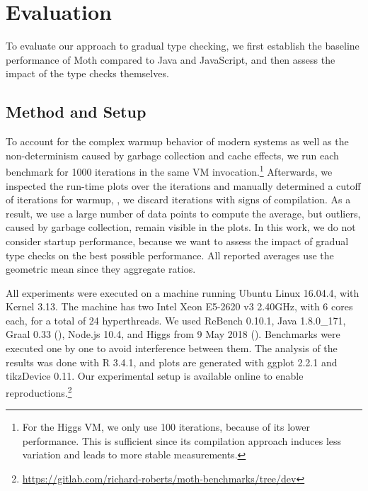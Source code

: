 
\section{Evaluation}
\label{sec:evaluation}

\newcommand{\NumIterationsAll}{1000\xspace}
\newcommand{\NumIterationsHiggs}{100\xspace}


To evaluate our approach to gradual type checking,
we first establish the baseline performance of Moth
compared to Java and JavaScript,
and then assess the impact of the type checks themselves.

\subsection{Method and Setup}

To account for the complex warmup behavior
of modern systems\citep{Barrett:2017:VMW} as well as
the non-determinism caused by \eg garbage collection and cache effects,
we run each benchmark for \NumIterationsAll iterations in the same
VM invocation.\footnote{
For the Higgs VM, we only use \NumIterationsHiggs iterations,
because of its lower performance.
This is sufficient since its compilation approach induces less variation
and leads to more stable measurements.}
Afterwards, we inspected the run-time plots over the iterations
and manually determined a cutoff of \WarmupCutOff iterations for warmup,
\ie, we discard iterations with signs of compilation.
As a result, we use a large number of data points to compute the average,
but outliers, caused by \eg garbage collection, remain visible in the plots.
In this work, we do not consider startup performance,
because we want to assess the impact of gradual type checks
on the best possible performance.
All reported averages use the geometric mean since they aggregate ratios.

All experiments were executed on a machine running Ubuntu Linux 16.04.4,
with Kernel 3.13.
The machine has two Intel Xeon E5-2620 v3 2.40GHz,
with 6 cores each, for a total of 24 hyperthreads.
We used ReBench 0.10.1\citep{ReBench:2018}, Java 1.8.0\_171, Graal 0.33 (),
Node.js 10.4, and Higgs from 9 May 2018 ().
Benchmarks were executed one by one to avoid interference between them.
The analysis of the results was done with R 3.4.1,
and plots are generated with ggplot 2.2.1 and tikzDevice 0.11.
Our experimental setup is available online to enable reproductions.\footnote{
\url{https://gitlab.com/richard-roberts/moth-benchmarks/tree/dev}}



